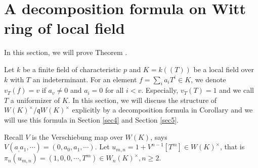 \documentclass{proc-l}
\theoremstyle{definition}
\theoremstyle{remark}
\numberwithin{equation}{section}
\begin{document}
{\section{A decomposition formula on Witt ring of local field}\label{sec3}

In this section, we will prove Theorem \boxed{\ref{13}}.

Let $k$ be a finite field of characteristic $p$ and $K=k(\!(T)\!)$ be a local field over $k$ with $T$ an indeterminant. For an element $f=\sum_ia_iT^i\in K$, we denote $v_T(f)=v$ if $a_v\neq 0$ and $a_i=0$ for all $i<v$. Especially, $v_T(T)=1$ and we call $T$ a uniformizer of $K$. In this section, we will discuss the structure of $W(K)^\times/\mathfrak qW(K)^\times$ explicitly by a decomposition formula in Corollary \boxed{\ref{3.7}} and we will use this formula in Section \ref{sec4} and Section \ref{sec5}.

Recall $V$ is the Verschiebung map over $W(K)$, says $V(a_,a_1,\cdots)=(0,a_0,a_1,\cdots)$. Let $u_{m,n}=1+V^{n-1}[T^m]\in W(K)^\times$, that is $\pi_n(u_{m,n})=(1,0,0,\cdots,T^m)\in W_n(K)^\times,n\geq2$. %

}
\end{document}
